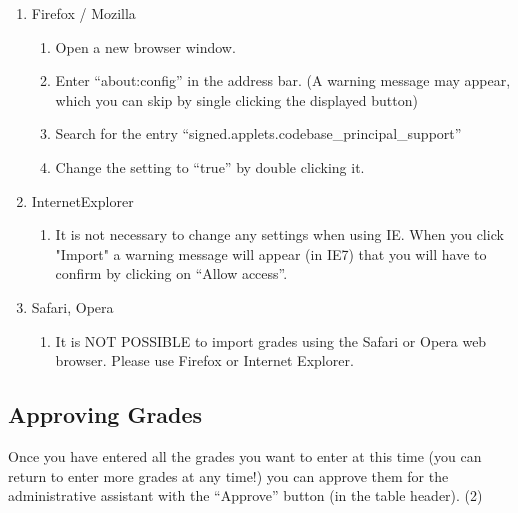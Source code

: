 \begin{enumerate}
\item Firefox / Mozilla
	\begin{enumerate}
	\item Open a new browser window.
	\item Enter "`about:config"' in the address bar. 
	(A warning message may appear, which you can skip by single clicking the displayed button)
	\item Search for the entry "`signed.applets.codebase\_principal\_support"'
	\item Change the setting to "`true"' by double clicking it.
	\end{enumerate}
\item InternetExplorer
	\begin{enumerate}
	\item It is not necessary to change any settings when using IE. When you click "Import" a warning message will appear (in IE7) that you will have to confirm by clicking on "`Allow access"'.
	\end{enumerate}
\item Safari, Opera
	\begin{enumerate}
	\item It is NOT POSSIBLE to import grades using the Safari or Opera web browser. Please use Firefox or Internet Explorer.
	\end{enumerate}
\end{enumerate}

\subsection{Approving Grades}
\label{freigabe}

Once you have entered all the grades you want to enter at this time (you can return to enter more grades at any time!) you can approve them for the administrative assistant with the "`Approve"' button (in the table header).
(2)


